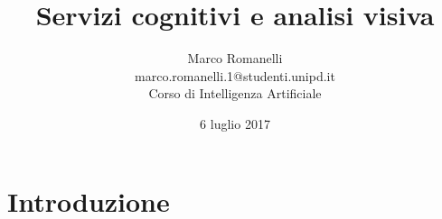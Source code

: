 \documentclass[12pt]{beamer}
\author[Romanelli,Marco]{Marco Romanelli\\[0.5\baselineskip]
\tiny marco.romanelli.1@studenti.unipd.it\\[1.5\baselineskip]
\scriptsize Corso di Intelligenza Artificiale}
\title{Servizi cognitivi e analisi visiva}
\institute{Universit\`a di Padova}
\date{6 luglio 2017}
\begin{document}
\section{Introduzione}\label{sec:intro}
\begin{frame}[t,plain]\titlepage\end{frame}


	\setcounter{framenumber}{0} %
	

\end{document}
